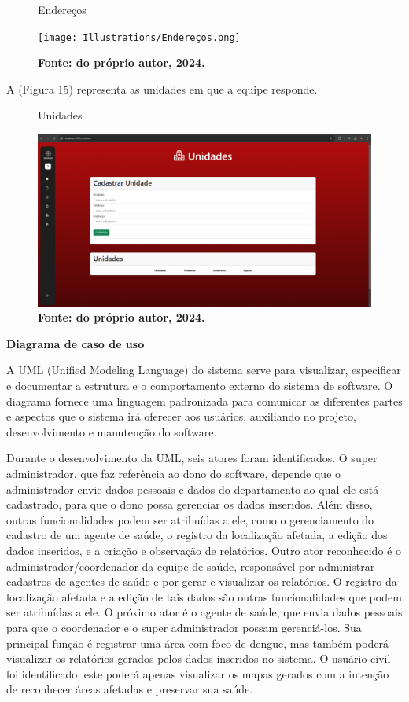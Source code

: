 \begin{figure}[H]
    \centering
    \caption{Endereços}
    \texttt{[image: Illustrations/Endereços.png]}
    \caption*{\textbf{Fonte: do próprio autor, 2024.}}
\end{figure}

\vspace{12pt}

A (Figura 15) representa as unidades em que a equipe responde.

\begin{figure}[H]
    \centering
    \caption{Unidades}
    \includegraphics[width=1.0\linewidth]{Illustrations/Unidades.png}
    \caption*{\textbf{Fonte: do próprio autor, 2024.}}
\end{figure}

\vspace{12pt}


\textbf{Diagrama de caso de uso}\newline

A UML (Unified Modeling Language) do sistema serve para visualizar, especificar e documentar a estrutura e o comportamento externo do sistema de software. O diagrama fornece uma linguagem padronizada para comunicar as diferentes partes e aspectos que o sistema irá oferecer aos usuários, auxiliando no projeto, desenvolvimento e manutenção do software. 

Durante o desenvolvimento da UML, seis atores foram identificados. O super administrador, que faz referência ao dono do software, depende que o administrador envie dados pessoais e dados do departamento ao qual ele está cadastrado, para que o dono possa gerenciar os dados inseridos. Além disso, outras funcionalidades podem ser atribuídas a ele, como o gerenciamento do cadastro de um agente de saúde, o registro da localização afetada, a edição dos dados inseridos, e a criação e observação de relatórios. Outro ator reconhecido é o administrador/coordenador da equipe de saúde, responsável por administrar cadastros de agentes de saúde e por gerar e visualizar os relatórios. O registro da localização afetada e a edição de tais dados são outras funcionalidades que podem ser atribuídas a ele. O próximo ator é o agente de saúde, que envia dados pessoais para que o coordenador e o super administrador possam gerenciá-los. Sua principal função é registrar uma área com foco de dengue, mas também poderá visualizar os relatórios gerados pelos dados inseridos no sistema. O usuário civil foi identificado, este poderá apenas visualizar os mapas gerados com a intenção de reconhecer áreas afetadas e preservar sua saúde.

